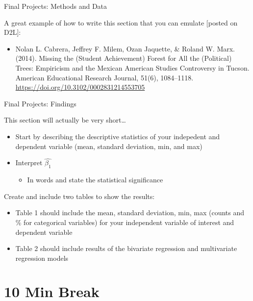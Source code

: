 \documentclass[
  8pt,
  ignorenonframetext,
  dvipsnames]{beamer}
\providecommand{\tightlist}{%
  \setlength{\itemsep}{0pt}\setlength{\parskip}{0pt}}
\let\olditem\item
\renewcommand{\item}{%
  \olditem\vspace{4pt}
}
\begin{document}
\begin{frame}{Final Projects: Methods and Data}
\medskip

A great example of how to write this section that you can emulate
{[}posted on D2L{]}:

\begin{itemize}
\tightlist
\item
  Nolan L. Cabrera, Jeffrey F. Milem, Ozan Jaquette, \& Roland W. Marx.
  (2014). Missing the (Student Achievement) Forest for All the
  (Political) Trees: Empiricism and the Mexican American Studies
  Controversy in Tucson. American Educational Research Journal, 51(6),
  1084--1118. \url{https://doi.org/10.3102/0002831214553705}
\end{itemize}

\end{frame}

\begin{frame}{Final Projects: Findings}
\protect\hypertarget{final-projects-findings}{}

This section will actually be very short\ldots{}

\begin{itemize}
\tightlist
\item
  Start by describing the descriptive statistics of your indepedent and
  dependent variable (mean, standard deviation, min, and max)
\item
  Interpret \(\hat{\beta_1}\)

  \begin{itemize}
  \tightlist
  \item
    In words and state the statistical significance
  \end{itemize}
\end{itemize}

\medskip

Create and include two tables to show the results:

\begin{itemize}
\tightlist
\item
  Table 1 should include the mean, standard deviation, min, max (counts
  and \% for categorical variables) for your independent variable of
  interest and dependent variable
\item
  Table 2 should include results of the bivariate regression and
  multivariate regression models
\end{itemize}

\end{frame}

\hypertarget{min-break}{%
\section{10 Min Break}\label{min-break}}
\end{document}

